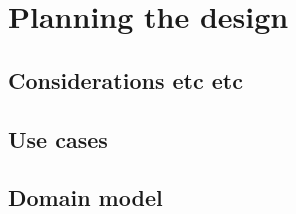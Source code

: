 \chapter{Planning the design}
\label{ch:planning}

\section{Considerations etc etc}

\section{Use cases}

\section{Domain model}
